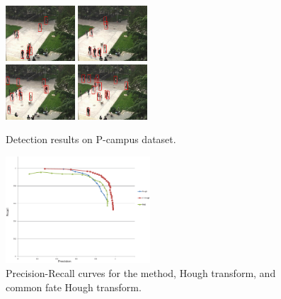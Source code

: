 \documentclass[paper]{ieice}
\begin{document}
\begin{figure}
\centering
\includegraphics[width=0.23\textwidth,bb=0 0 720 576]{org36.jpg}
\includegraphics[width=0.23\textwidth,bb=0 0 720 576]{org71.jpg}\\
\includegraphics[width=0.23\textwidth,bb=0 0 720 576]{org261.jpg}
\includegraphics[width=0.23\textwidth,bb=0 0 720 576]{org376.jpg}
\caption{Detection results on P-campus dataset.}
\label{fig:pcam}
\end{figure}


\begin{figure}[!htbp]
\centering

\includegraphics[width=0.48\textwidth]{cmf.eps}


\caption{Precision-Recall curves for the method, Hough transform, and common fate Hough transform.}
\label{fig:cmf}
\end{figure}
\end{document}
